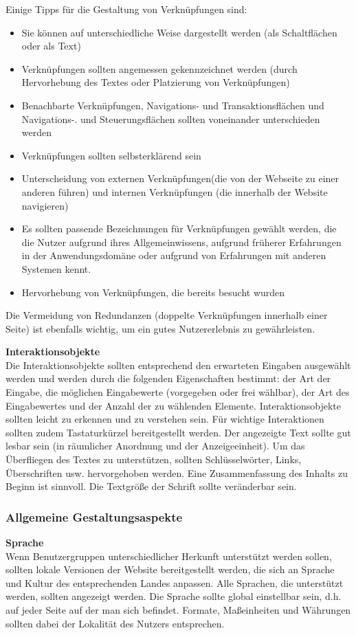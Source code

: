 \documentclass[utf8,biblatex]{lni}
\begin{document}
Einige Tipps für die Gestaltung von Verknüpfungen sind:
\begin{itemize}
  \item Sie können auf unterschiedliche Weise dargestellt werden (als Schaltflächen oder als Text)
  \item Verknüpfungen sollten angemessen gekennzeichnet werden (durch Hervorhebung des Textes oder Platzierung von Verknüpfungen)
  \item Benachbarte Verknüpfungen, Navigations- und Transaktionsflächen und Navigations-. und Steuerungsflächen sollten voneinander unterschieden werden
  \item Verknüpfungen sollten selbsterklärend sein 
  \item Unterscheidung von externen Verknüpfungen(die von der Webseite zu einer anderen führen) und internen Verknüpfungen (die innerhalb der Website navigieren)
  \item Es sollten passende Bezeichnungen für Verknüpfungen gewählt werden, die die Nutzer aufgrund ihres Allgemeinwissens, aufgrund früherer Erfahrungen in der Anwendungsdomäne oder aufgrund von Erfahrungen mit anderen Systemen kennt.
  \item Hervorhebung von Verknüpfungen, die bereits besucht wurden
\end{itemize}

Die Vermeidung von Redundanzen (doppelte Verknüpfungen innerhalb einer Seite) ist ebenfalls wichtig, um ein gutes Nutzererlebnis zu gewährleisten.

\textbf{Interaktionsobjekte}\\
Die Interaktionsobjekte sollten entsprechend den erwarteten Eingaben ausgewählt werden und werden durch die folgenden Eigenschaften bestimmt: der Art der Eingabe, die möglichen Eingabewerte (vorgegeben oder frei wählbar), der Art des Eingabewertes und der Anzahl der zu wählenden Elemente. Interaktionsobjekte sollten leicht zu erkennen und zu verstehen sein. Für wichtige Interaktionen sollten zudem Tastaturkürzel bereitgestellt werden. Der angezeigte Text sollte gut lesbar sein (in räumlicher Anordnung und der Anzeigeeinheit). Um das Überfliegen des Textes zu unterstützen, sollten Schlüsselwörter, Links, Überschriften usw. hervorgehoben werden. Eine Zusammenfassung des Inhalts zu Beginn ist sinnvoll. Die Textgröße der Schrift sollte veränderbar sein. 

\subsubsection{Allgemeine Gestaltungsaspekte}
\textbf{Sprache}\\
Wenn Benutzergruppen unterschiedlicher Herkunft unterstützt werden sollen, sollten lokale Versionen der Website bereitgestellt werden, die sich an Sprache und Kultur des entsprechenden Landes anpassen. Alle Sprachen, die unterstützt werden, sollten angezeigt werden. Die Sprache sollte global einstellbar sein, d.h. auf jeder Seite auf der man sich befindet. Formate, Maßeinheiten und Währungen sollten dabei der Lokalität des Nutzers entsprechen.
\end{document}
